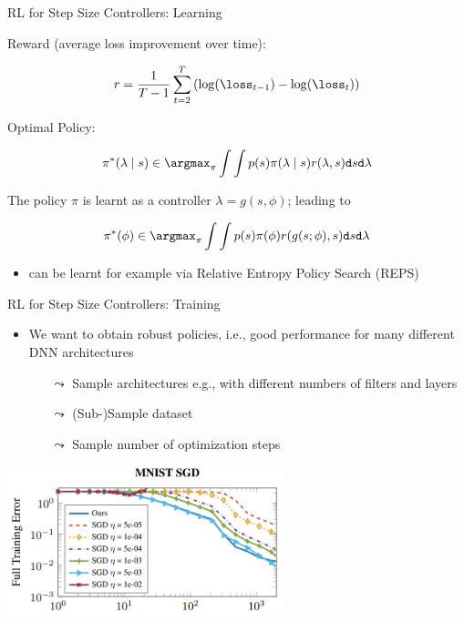 \begin{frame}[c]{RL for Step Size Controllers: Learning }

Reward (average loss improvement over time):

$$r = \frac{1}{T-1} \sum_{t=2}^T \left(\log(\loss_{t-1}) - \log(\loss_t)\right)$$

\pause

Optimal Policy:

$$\pi^*(\lambda \mid s) \in \argmax_{\pi} \int \int p(s) \pi(\lambda\mid s)r(\lambda,s) \texttt{d}s \texttt{d}\lambda $$

\pause

The policy $\pi$ is learnt as a controller $\lambda = g(s, \phi)$; leading to

$$\pi^*(\phi) \in \argmax_{\pi} \int \int p(s) \pi(\phi)r(g(s;\phi),s) \texttt{d}s \texttt{d}\lambda $$

\pause

\begin{itemize}
	\item can be learnt for example via Relative Entropy Policy Search (REPS) 
\end{itemize}

\end{frame}
\begin{frame}[c]{RL for Step Size Controllers: Training }

\begin{itemize}
	\item We want to obtain robust policies, i.e., good performance for many different DNN architectures
	\begin{itemize}
		\item[$\leadsto$] Sample architectures e.g., with different numbers of filters and layers
		\item[$\leadsto$] (Sub-)Sample dataset
		\item[$\leadsto$] Sample number of optimization steps
	\end{itemize}
\end{itemize}

\centering
\includegraphics[width=0.6\textwidth]{images/l2stepsizecontroler_mnist_training.png}

\end{frame}
